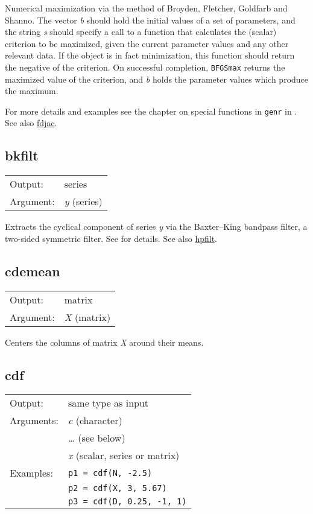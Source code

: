 	  Numerical maximization via the method of Broyden, Fletcher, Goldfarb
	  and Shanno.  The vector \textsl{b} should hold the initial
	  values of a set of parameters, and the string \textsl{s}
	  should specify a call to a function that calculates the (scalar)
	  criterion to be maximized, given the current parameter values and
	  any other relevant data. If the object is in fact minimization, this
	  function should return the negative of the criterion.  On successful
	  completion, \texttt{BFGSmax} returns the maximized value of the
	  criterion, and \textsl{b} holds the parameter values which
	  produce the maximum.  

	  For more details and examples see the chapter
	  on special functions in \texttt{genr} in 
	  \GUG{}.
	  See also \hyperlink{func-fdjac}{fdjac}.

\subsection{bkfilt}
\hypertarget{func-bkfilt}{}

\begin{tabular}{ll}
Output:     & series\\
Argument:   & \textsl{y} (series)\\
\end{tabular}

	  Extracts the cyclical component of series \textsl{y}
	  via the Baxter--King bandpass filter, a two-sided symmetric
	  filter. See \GUG{} for details.
	  See also \hyperlink{func-hpfilt}{hpfilt}.

\subsection{cdemean}
\hypertarget{func-cdemean}{}

\begin{tabular}{ll}
Output:     & matrix\\
Argument:   & \textsl{X} (matrix)\\
\end{tabular}

	  Centers the columns of matrix \textsl{X} around their
	  means.

\subsection{cdf}
\hypertarget{func-cdf}{}

\begin{tabular}{ll}
Output:     & same type as input\\
Arguments:  & \textsl{c} (character)\\
           & \textsl{\dots{}} (see below)\\
           & \textsl{x} (scalar, series or matrix)\\
Examples:    & \texttt{p1 = cdf(N, -2.5)} \\ 
 & \texttt{p2 = cdf(X, 3, 5.67)} \\ 
 & \texttt{p3 = cdf(D, 0.25, -1, 1)}
\end{tabular}

